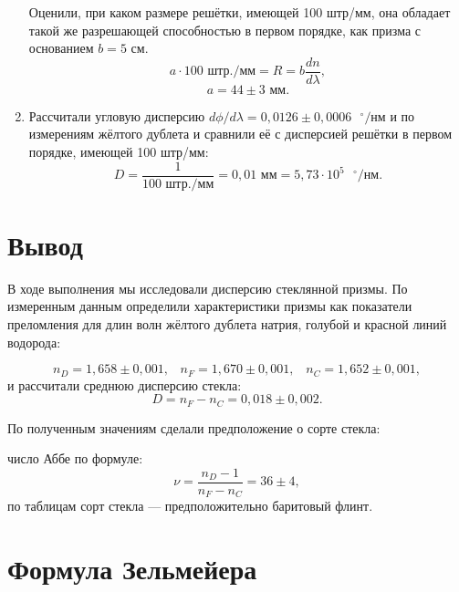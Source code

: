 \documentclass[a4paper, 12pt]{article}%
\begin{document}
\begin{enumerate}
	Оценили, при каком размере решётки, имеющей 100 штр/мм, она обладает такой же разрешающей способностью в первом порядке, как призма с основанием $b = 5$ см.
	\begin{equation*}
	a\cdot100\text{ штр./мм} = R = b\dfrac{dn}{d\lambda},
	\end{equation*}
	\begin{equation*}
	a = 44\pm3 \text{ мм}.
	\end{equation*}
	\item Рассчитали угловую дисперсию $d\phi/d\lambda = 0{,}0126\pm0{,}0006\text{ }^\circ\text{/нм}$ и по измерениям жёлтого дублета и сравнили её с дисперсией решётки в первом порядке, имеющей 100 штр/мм:
	\begin{equation*}
	D = \dfrac{1}{100\text{ штр./мм}} = 0{,}01\text{ мм} = 5{,}73\cdot10^5\text{ }^\circ\text{/нм}.
	\end{equation*}
\end{enumerate}

\section*{Вывод}

В ходе выполнения мы исследовали дисперсию стеклянной призмы. По измеренным данным определили  характеристики призмы как показатели преломления для длин волн жёлтого дублета натрия, голубой и красной линий водорода:

\begin{equation*}
	n_D = 1{,}658\pm0{,}001,\;\;\;n_F = 1{,}670\pm0{,}001,\;\;\;n_C = 1{,}652\pm0{,}001,
	\end{equation*}
и рассчитали среднюю дисперсию стекла:
	\begin{equation*}
		D = n_F - n_C = 0{,}018\pm0{,}002.
	\end{equation*}

По полученным значениям сделали предположение о сорте стекла:

число Аббе по формуле:
	\begin{equation*}
	\nu = \dfrac{n_D - 1}{n_F - n_C} = 36\pm 4,
	\end{equation*}
	 по таблицам сорт стекла --- предположительно баритовый флинт.


\section{Формула Зельмейера}
\end{document}
